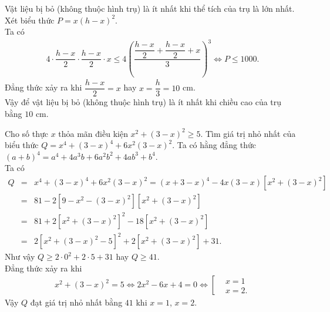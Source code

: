 \begin{ex}
{{
  }
  \noindent
  Vật liệu bị bỏ (không thuộc hình trụ) là ít nhất khi thể tích của trụ là lớn nhất.\\
  Xét biểu thức $P=x(h-x)^2$.\\
  Ta có
  \begin{eqnarray*}
  4 \cdot \dfrac{h-x}{2} \cdot \dfrac{h-x}{2} \cdot x \leq 4\left(\dfrac{\dfrac{h-x}{2}+\dfrac{h-x}{2}+x}{3}\right)^3 \Leftrightarrow P \leq 1000.
  \end{eqnarray*}
  Đẳng thức xảy ra khi $\dfrac{h-x}{2}=x$ hay $x=\dfrac{h}3{=10}$ cm.\\
  Vậy để vật liệu bị bỏ (không thuộc hình trụ) là ít nhất khi chiều cao của trụ bằng $10$ cm.
  }
\end{ex}

\begin{ex}%
 Cho số thực $x$ thỏa mãn điều kiện $x^2+(3-x)^2\geq 5$. Tìm giá trị nhỏ nhất của biểu thức $Q=x^4+(3-x)^4+6x^2(3-x)^2$.
 \loigiai
  {
  Ta có hằng đẳng thức $(a+b)^4=a^4+4a^3b+6a^2b^2+4ab^3+b^4$.\\
  Ta có
  \allowdisplaybreaks
  \begin{eqnarray*}
   Q&=& x^4+(3-x)^4+6x^2(3-x)^2= (x+3-x)^4-4x(3-x)\left[x^2+(3-x)^2\right]\\
    &=& 81 -2\left[9-x^2-(3-x)^2\right]\left[x^2+(3-x)^2\right]\\
    &=& 81 +2\left[x^2+(3-x)^2\right]^2 -18\left[x^2+(3-x)^2\right]\\
    &=& 2\left[x^2+(3-x)^2-5\right]^2+2\left[x^2+(3-x)^2\right]+31.
  \end{eqnarray*}
  Như vậy $Q \geq 2\cdot 0^2 + 2\cdot 5 + 31$ hay $Q \geq 41$.\\
  Đẳng thức xảy ra khi
  \begin{eqnarray*}
   x^2+(3-x)^2=5 \Leftrightarrow 2x^2-6x+4=0 \Leftrightarrow \left[\begin{aligned}&x=1 \\&x=2. \end{aligned} \right.
  \end{eqnarray*}
  Vậy $Q$ đạt giá trị nhỏ nhất bằng $41$ khi $x=1$, $x=2$.
  }
\end{ex}


